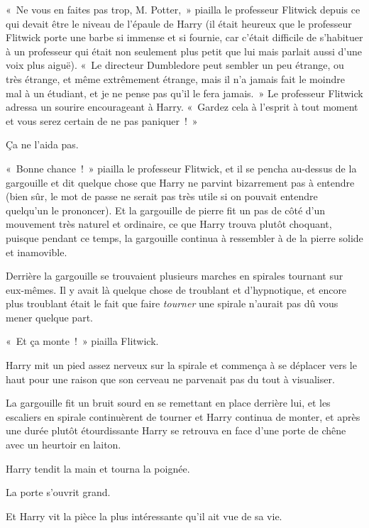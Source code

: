 «~Ne vous en faites pas trop, M. Potter,~» piailla le professeur Flitwick depuis ce qui devait être le niveau de l'épaule de Harry (il était heureux que le professeur Flitwick porte une barbe si immense et si fournie, car c'était difficile de s'habituer à un professeur qui était non seulement plus petit que lui mais parlait aussi d'une voix plus aiguë). «~Le directeur Dumbledore peut sembler un peu étrange, ou très étrange, et même extrêmement étrange, mais il n'a jamais fait le moindre mal à un étudiant, et je ne pense pas qu'il le fera jamais.~» Le professeur Flitwick adressa un sourire encourageant à Harry. «~Gardez cela à l'esprit à tout moment et vous serez certain de ne pas paniquer~!~»

Ça ne l'aida pas.

«~Bonne chance~!~» piailla le professeur Flitwick, et il se pencha au-dessus de la gargouille et dit quelque chose que Harry ne parvint bizarrement pas à entendre (bien sûr, le mot de passe ne serait pas très utile si on pouvait entendre quelqu'un le prononcer). Et la gargouille de pierre fit un pas de côté d'un mouvement très naturel et ordinaire, ce que Harry trouva plutôt choquant, puisque pendant ce temps, la gargouille continua à ressembler à de la pierre solide et inamovible.

Derrière la gargouille se trouvaient plusieurs marches en spirales tournant sur eux-mêmes. Il y avait là quelque chose de troublant et d'hypnotique, et encore plus troublant était le fait que faire \emph{tourner} une spirale n'aurait pas dû vous mener quelque part.

«~Et ça monte~!~» piailla Flitwick.

Harry mit un pied assez nerveux sur la spirale et commença à se déplacer vers le haut pour une raison que son cerveau ne parvenait pas du tout à visualiser.

La gargouille fit un bruit sourd en se remettant en place derrière lui, et les escaliers en spirale continuèrent de tourner et Harry continua de monter, et après une durée plutôt étourdissante Harry se retrouva en face d'une porte de chêne avec un heurtoir en laiton.

Harry tendit la main et tourna la poignée.

La porte s'ouvrit grand.

Et Harry vit la pièce la plus intéressante qu'il ait vue de sa vie.

